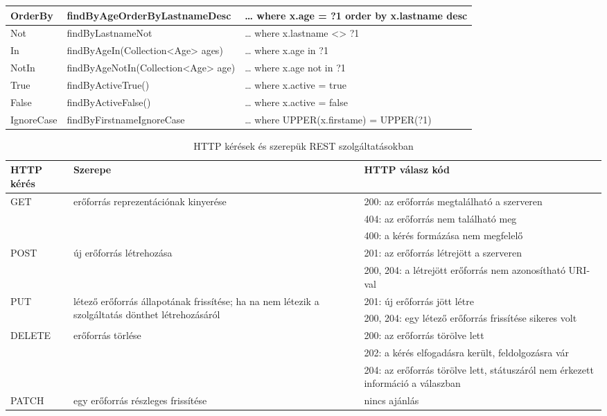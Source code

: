 \begin{longtable}{| p{.20\linewidth} | p{.30\linewidth} | p{.50\linewidth } |}
			\hline
			OrderBy &	findByAgeOrderByLastnameDesc	& … where x.age = ?1 order by x.lastname desc \\
			\hline
			Not &	findByLastnameNot	& … where x.lastname <> ?1 \\
			\hline
			In &	findByAgeIn(Collection<Age> \linebreak ages)	& … where x.age in ?1 \\
			\hline
			NotIn &	findByAgeNotIn(Collection<Age> \linebreak age)	& … where x.age not in ?1 \\
			\hline
			True &	findByActiveTrue()	& … where x.active = true \\
			\hline
			False &	findByActiveFalse()	& … where x.active = false \\
			\hline
			IgnoreCase &	findByFirstnameIgnoreCase	& … where UPPER(x.firstame) = UPPER(?1) \\
			\hline
	\end{longtable}

	\begin{longtable}{| p{.20\linewidth} | p{.50\linewidth} | p{.30\linewidth } |}		
					\caption{HTTP kérések és szerepük REST szolgáltatásokban}
		\label{tab:restAndHttp} \\
		\hline
		HTTP kérés & Szerepe & HTTP válasz kód \\
		\hline
		
		\multirow{3}{*}{GET} & \multirow{3}{*}{erőforrás reprezentációnak kinyerése} & 
		 200: az erőforrás megtalálható a szerveren \\
		 \cline{3-3}
		  & & 404: az erőforrás nem található meg \\
		  		 \cline{3-3}
		  & & 400: a kérés formázása nem megfelelő \\
		\hline
		
		\multirow{2}{*}{POST} & \multirow{2}{*}{új erőforrás létrehozása} & 
		201: az erőforrás létrejött a szerveren\\
		\cline{3-3}
		& & 200, 204: a létrejött erőforrás nem azonosítható URI-val \\
		\hline
		
		\multirow{2}{*}{PUT} & \multirow{2}{*}{\parbox{\linewidth}{létező erőforrás állapotának frissítése; ha na nem létezik a  szolgáltatás dönthet létrehozásáról}} & 
		201: új erőforrás jött létre \\
		\cline{3-3}
		& & 200, 204: egy létező erőforrás frissítése sikeres volt \\
		\hline
		
		\multirow{3}{*}{DELETE} & \multirow{3}{*}{erőforrás törlése} & 
		200: az erőforrás törölve lett \\
		\cline{3-3}
		& & 202: a kérés elfogadásra került, feldolgozásra vár \\
		\cline{3-3}
		& & 204: az erőforrás törölve lett, státuszáról nem érkezett információ a válaszban \\
		\hline
		
		PATCH & egy erőforrás részleges frissítése & nincs ajánlás\\
		\hline
	\end{longtable}